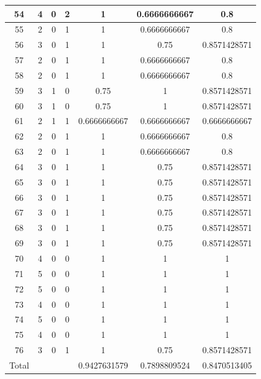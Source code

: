 \begin{table}
\begin{tabular}{|c|c|c|c|c|c|c|}
                \hline
                        54 & 4 & 0 & 2 & 1 & 0.6666666667 & 0.8 \\ 
                \hline
                        55 & 2 & 0 & 1 & 1 & 0.6666666667 & 0.8 \\ 
                \hline
                        56 & 3 & 0 & 1 & 1 & 0.75 & 0.8571428571 \\ 
                \hline
                        57 & 2 & 0 & 1 & 1 & 0.6666666667 & 0.8 \\ 
                \hline
                        58 & 2 & 0 & 1 & 1 & 0.6666666667 & 0.8 \\ 
                \hline
                        59 & 3 & 1 & 0 & 0.75 & 1 & 0.8571428571 \\ 
                \hline
                        60 & 3 & 1 & 0 & 0.75 & 1 & 0.8571428571 \\ 
                \hline
                        61 & 2 & 1 & 1 & 0.6666666667 & 0.6666666667 & 0.6666666667 \\ 
                \hline
                        62 & 2 & 0 & 1 & 1 & 0.6666666667 & 0.8 \\ 
                \hline
                        63 & 2 & 0 & 1 & 1 & 0.6666666667 & 0.8 \\ 
                \hline
                        64 & 3 & 0 & 1 & 1 & 0.75 & 0.8571428571 \\ 
                \hline
                        65 & 3 & 0 & 1 & 1 & 0.75 & 0.8571428571 \\ 
                \hline
                        66 & 3 & 0 & 1 & 1 & 0.75 & 0.8571428571 \\ 
                \hline
                        67 & 3 & 0 & 1 & 1 & 0.75 & 0.8571428571 \\ 
                \hline
                        68 & 3 & 0 & 1 & 1 & 0.75 & 0.8571428571 \\ 
                \hline
                        69 & 3 & 0 & 1 & 1 & 0.75 & 0.8571428571 \\ 
                \hline
                        70 & 4 & 0 & 0 & 1 & 1 & 1 \\ 
                \hline
                        71 & 5 & 0 & 0 & 1 & 1 & 1 \\ 
                \hline
                        72 & 5 & 0 & 0 & 1 & 1 & 1 \\ 
                \hline
                        73 & 4 & 0 & 0 & 1 & 1 & 1 \\ 
                \hline
                        74 & 5 & 0 & 0 & 1 & 1 & 1 \\ 
                \hline
                        75 & 4 & 0 & 0 & 1 & 1 & 1 \\ 
                \hline
                        76 & 3 & 0 & 1 & 1 & 0.75 & 0.8571428571 \\ 
                \hline
                        Total &  &  &  & 0.9427631579 & 0.7898809524 & 0.8470513405 \\ 
                \hline
                \end{tabular}
        \end{table} 
